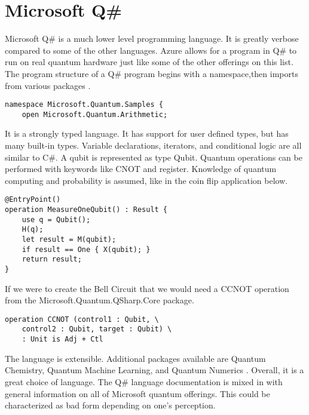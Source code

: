 \documentclass[conference]{IEEEtran}
\begin{document}
\section{Microsoft Q\#}
Microsoft Q\# is a much lower level programming language. 
It is greatly verbose compared to some of the other languages. 
Azure allows for a program in Q\# to run on real quantum hardware just like some of the other offerings on this list. 
The program structure of a Q\# program begins with a namespace,then imports from various packages \cite{b6}. 
\begin{verbatim}
namespace Microsoft.Quantum.Samples {
    open Microsoft.Quantum.Arithmetic; 
\end{verbatim}
It is a strongly typed language. 
It has support for user defined types, but has many built-in types. 
Variable declarations, iterators, and conditional logic are all similar to C\#. 
A qubit is represented as type Qubit. 
Quantum operations can be performed with keywords like CNOT and register. 
Knowledge of quantum computing and probability is assumed, like in the coin flip application below. 
\begin{verbatim}
@EntryPoint()
operation MeasureOneQubit() : Result {
    use q = Qubit();  
    H(q);      
    let result = M(qubit);
    if result == One { X(qubit); }
    return result;
}
\end{verbatim}
If we were to create the Bell Circuit that we would need a CCNOT operation from the Microsoft.Quantum.QSharp.Core package. 
\begin{verbatim}
operation CCNOT (control1 : Qubit, \
    control2 : Qubit, target : Qubit) \
    : Unit is Adj + Ctl
\end{verbatim}

The language is extensible. Additional packages available are Quantum Chemistry, Quantum Machine Learning, and Quantum Numerics \cite{b6}. 
Overall, it is a great choice of language. 
The Q\# language documentation is mixed in with general information on all of Microsoft quantum offerings. 
This could be characterized as bad form depending on one's perception.
\end{document}
